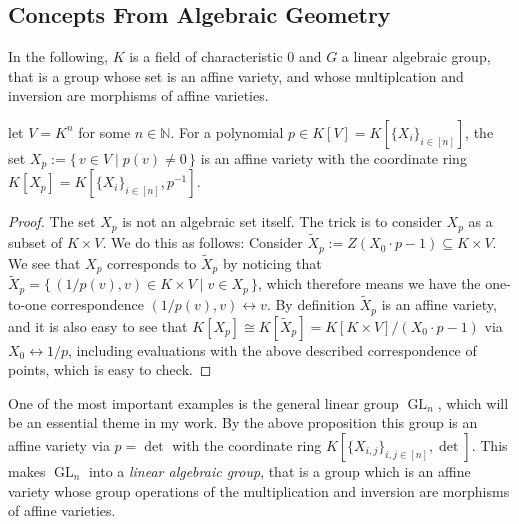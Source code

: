 \subsection{Concepts From Algebraic Geometry}

In the following, $K$ is a field of characteristic $0$ and $G$ a linear algebraic group, that is a group whose set is an affine variety, and whose multiplcation and inversion are morphisms of affine varieties.

\begin{proposition}
  let $V = K^n$ for some $n \in \mathbb{N}$.
  For a polynomial $p \in K[V] = K[\{X_i\}_{i\in[n]}]$, the set $ X_p := \{\, v \in V \mid p(v) \neq 0 \,\}$ is an affine variety with the coordinate ring $K[X_p] = K[\{X_i\}_{i \in [n]}, p^{-1}]$.
\end{proposition}

\begin{proof}
  The set $X_p$ is not an algebraic set itself.
  The trick is to consider $X_p$ as a subset of $K \times V$.
  We do this as follows:
  Consider $\tilde{X}_p := Z \left( X_0 \cdot p -1 \right) \subseteq K \times V$.
  We see that $X_p$ corresponds to $\tilde{X}_p$ by noticing that $\tilde{X}_p = \{\, (1/p(v), v) \in K \times V \mid v \in X_p \,\}$, which therefore means we have the one-to-one correspondence $(1/p(v),v) \leftrightarrow v$.
  By definition $\tilde{X}_p$ is an affine variety, and it is also easy to see that $K[X_p] \cong K[\tilde{X}_p] = K[K\times V] / (X_0 \cdot p -1)$ via $X_0 \leftrightarrow 1/p$, including evaluations with the above described correspondence of points, which is easy to check.
\end{proof}

\begin{example}
  One of the most important examples is the general linear group $\operatorname{GL}_n$, which will be an essential theme in my work.
  By the above proposition this group is an affine variety via $p = \operatorname{det}$ with the coordinate ring $K[\{X_{i,j}\}_{i,j \in [n]}, \operatorname{det}]$.
  This makes $\operatorname{GL}_n$ into a \textit{linear algebraic group}, that is a group which is an affine variety whose group operations of the multiplication and inversion are morphisms of affine varieties.
\end{example}

